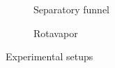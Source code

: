 \documentclass{article}
\begin{document}
\begin{figure}[!ht]
    \begin{subfigure}{0.49\textwidth}
        \centering
        \caption{Separatory funnel}
        \label{fig:sepFunnel}
    \end{subfigure}
    \begin{subfigure}{0.49\textwidth}
        \centering
        \caption{Rotavapor}
        \label{fig:rotavapor}   
    \end{subfigure}
    \caption{Experimental setups}
    \label{fig:expSetups}
\end{figure}
\FloatBarrier
\end{document}
